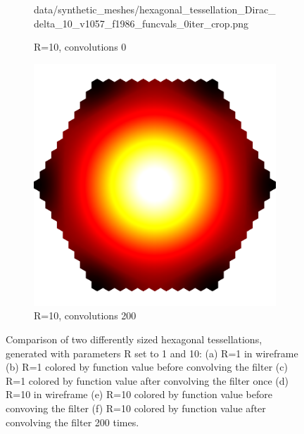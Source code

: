 \begin{figure}[ht]
\begin{subfigure}[b]{0.32\linewidth}
		{data/synthetic_meshes/hexagonal_tessellation_Dirac_delta_10_v1057_f1986_funcvals_0iter_crop.png}
		\caption{R=10, convolutions 0}\label{fig:hex.e}
	\end{subfigure}
	\begin{subfigure}[b]{0.32\linewidth}
		\includegraphics[width=\linewidth]{data/synthetic_meshes/hexagonal_tessellation_Dirac_delta_10_v1057_f1986_funcvals_200iter_crop.png}
		\caption{R=10, convolutions 200}\label{fig:hex.f}
	\end{subfigure}
	\caption[Six views, comparing two differently sized hexagonal tessellations]{Comparison of two differently sized hexagonal tessellations, generated with parameters R set to 1 and 10: (a) R=1 in wireframe (b) R=1 colored by function value before convolving the filter (c) R=1 colored by function value after convolving the filter once (d) R=10 in wireframe (e) R=10 colored by function value before convoving the filter (f) R=10 colored by function value after convolving the filter 200 times.}
	\label{fig:hex}
\end{figure}
\todoCitation{}
